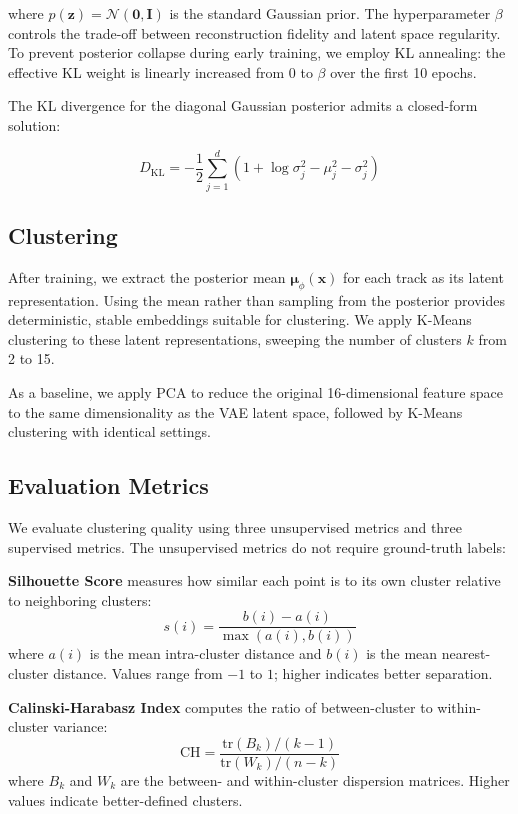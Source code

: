 \documentclass[11pt]{article}
\begin{document}
where $p(\mathbf{z}) = \mathcal{N}(\mathbf{0}, \mathbf{I})$ is the standard Gaussian prior. The hyperparameter $\beta$ controls the trade-off between reconstruction fidelity and latent space regularity. To prevent posterior collapse during early training, we employ KL annealing: the effective KL weight is linearly increased from 0 to $\beta$ over the first 10 epochs.

The KL divergence for the diagonal Gaussian posterior admits a closed-form solution:

\begin{equation}
    D_{\text{KL}} = -\frac{1}{2} \sum_{j=1}^{d} \left(1 + \log \sigma_j^2 - \mu_j^2 - \sigma_j^2 \right)
\end{equation}

\subsection{Clustering}

After training, we extract the posterior mean $\boldsymbol{\mu}_\phi(\mathbf{x})$ for each track as its latent representation. Using the mean rather than sampling from the posterior provides deterministic, stable embeddings suitable for clustering. We apply K-Means clustering to these latent representations, sweeping the number of clusters $k$ from 2 to 15.

As a baseline, we apply PCA to reduce the original 16-dimensional feature space to the same dimensionality as the VAE latent space, followed by K-Means clustering with identical settings.

\subsection{Evaluation Metrics}

We evaluate clustering quality using three unsupervised metrics and three supervised metrics. The unsupervised metrics do not require ground-truth labels:

\textbf{Silhouette Score} measures how similar each point is to its own cluster relative to neighboring clusters:
\begin{equation}
    s(i) = \frac{b(i) - a(i)}{\max(a(i), b(i))}
\end{equation}
where $a(i)$ is the mean intra-cluster distance and $b(i)$ is the mean nearest-cluster distance. Values range from $-1$ to $1$; higher indicates better separation.

\textbf{Calinski-Harabasz Index} computes the ratio of between-cluster to within-cluster variance:
\begin{equation}
    \text{CH} = \frac{\text{tr}(B_k) / (k - 1)}{\text{tr}(W_k) / (n - k)}
\end{equation}
where $B_k$ and $W_k$ are the between- and within-cluster dispersion matrices. Higher values indicate better-defined clusters.
\end{document}
